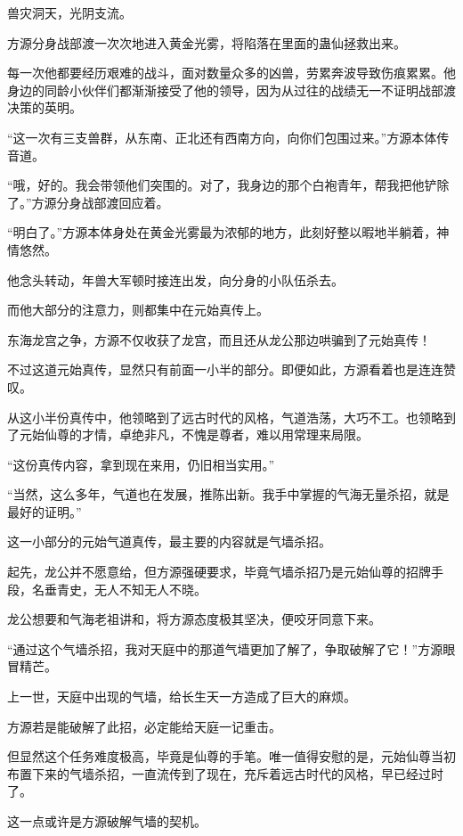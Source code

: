 
\begin{this_body}

兽灾洞天，光阴支流。

方源分身战部渡一次次地进入黄金光雾，将陷落在里面的蛊仙拯救出来。

每一次他都要经历艰难的战斗，面对数量众多的凶兽，劳累奔波导致伤痕累累。他身边的同龄小伙伴们都渐渐接受了他的领导，因为从过往的战绩无一不证明战部渡决策的英明。

“这一次有三支兽群，从东南、正北还有西南方向，向你们包围过来。”方源本体传音道。

“哦，好的。我会带领他们突围的。对了，我身边的那个白袍青年，帮我把他铲除了。”方源分身战部渡回应着。

“明白了。”方源本体身处在黄金光雾最为浓郁的地方，此刻好整以暇地半躺着，神情悠然。

他念头转动，年兽大军顿时接连出发，向分身的小队伍杀去。

而他大部分的注意力，则都集中在元始真传上。

东海龙宫之争，方源不仅收获了龙宫，而且还从龙公那边哄骗到了元始真传！

不过这道元始真传，显然只有前面一小半的部分。即便如此，方源看着也是连连赞叹。

从这小半份真传中，他领略到了远古时代的风格，气道浩荡，大巧不工。也领略到了元始仙尊的才情，卓绝非凡，不愧是尊者，难以用常理来局限。

“这份真传内容，拿到现在来用，仍旧相当实用。”

“当然，这么多年，气道也在发展，推陈出新。我手中掌握的气海无量杀招，就是最好的证明。”

这一小部分的元始气道真传，最主要的内容就是气墙杀招。

起先，龙公并不愿意给，但方源强硬要求，毕竟气墙杀招乃是元始仙尊的招牌手段，名垂青史，无人不知无人不晓。

龙公想要和气海老祖讲和，将方源态度极其坚决，便咬牙同意下来。

“通过这个气墙杀招，我对天庭中的那道气墙更加了解了，争取破解了它！”方源眼冒精芒。

上一世，天庭中出现的气墙，给长生天一方造成了巨大的麻烦。

方源若是能破解了此招，必定能给天庭一记重击。

但显然这个任务难度极高，毕竟是仙尊的手笔。唯一值得安慰的是，元始仙尊当初布置下来的气墙杀招，一直流传到了现在，充斥着远古时代的风格，早已经过时了。

这一点或许是方源破解气墙的契机。


\end{this_body}
